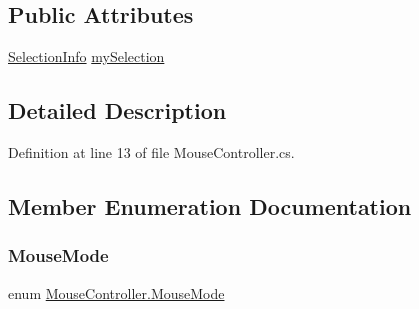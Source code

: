 \subsection*{Public Attributes}
\begin{DoxyCompactItemize}
\item 
\hyperlink{class_selection_info}{Selection\+Info} \hyperlink{class_mouse_controller_ac4180c166ce9084e0f817ab7e7f930fd}{my\+Selection}
\end{DoxyCompactItemize}


\subsection{Detailed Description}


Definition at line 13 of file Mouse\+Controller.\+cs.



\subsection{Member Enumeration Documentation}
\mbox{\label{class_mouse_controller_aa9b016ba73cc945841e3fae192330a51}} 
\subsubsection{\texorpdfstring{Mouse\+Mode}{MouseMode}}
{\footnotesize\ttfamily enum \hyperlink{class_mouse_controller_aa9b016ba73cc945841e3fae192330a51}{Mouse\+Controller.\+Mouse\+Mode}\hspace{0.3cm}{\ttfamily [strong]}}


